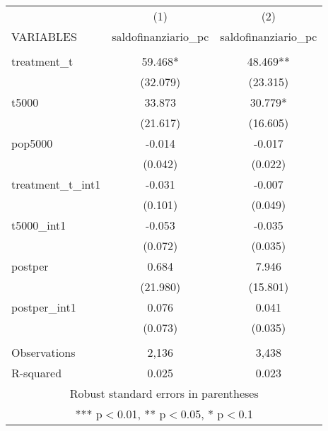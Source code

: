 \documentclass[]{article}
\begin{document}
\begin{tabular}{lcc} \hline
 & (1) & (2) \\
VARIABLES & saldofinanziario\_pc & saldofinanziario\_pc \\ \hline
 &  &  \\
treatment\_t & 59.468* & 48.469** \\
 & (32.079) & (23.315) \\
t5000 & 33.873 & 30.779* \\
 & (21.617) & (16.605) \\
pop5000 & -0.014 & -0.017 \\
 & (0.042) & (0.022) \\
treatment\_t\_int1 & -0.031 & -0.007 \\
 & (0.101) & (0.049) \\
t5000\_int1 & -0.053 & -0.035 \\
 & (0.072) & (0.035) \\
postper & 0.684 & 7.946 \\
 & (21.980) & (15.801) \\
postper\_int1 & 0.076 & 0.041 \\
 & (0.073) & (0.035) \\
 &  &  \\
Observations & 2,136 & 3,438 \\
 R-squared & 0.025 & 0.023 \\ \hline
\multicolumn{3}{c}{ Robust standard errors in parentheses} \\
\multicolumn{3}{c}{ *** p$<$0.01, ** p$<$0.05, * p$<$0.1} \\
\end{tabular}
\end{document}

